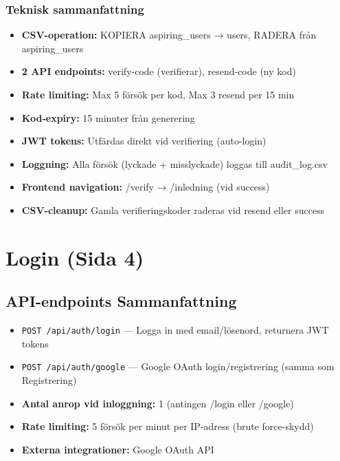 \documentclass[12pt,a4paper]{article}
\begin{document}
\subsubsection{Teknisk sammanfattning}
\begin{itemize}[noitemsep]
  \item \textbf{CSV-operation:} KOPIERA aspiring\_users → users, RADERA från aspiring\_users
  \item \textbf{2 API endpoints:} verify-code (verifierar), resend-code (ny kod)
  \item \textbf{Rate limiting:} Max 5 försök per kod, Max 3 resend per 15 min
  \item \textbf{Kod-expiry:} 15 minuter från generering
  \item \textbf{JWT tokens:} Utfärdas direkt vid verifiering (auto-login)
  \item \textbf{Loggning:} Alla försök (lyckade + misslyckade) loggas till audit\_log.csv
  \item \textbf{Frontend navigation:} /verify → /inledning (vid success)
  \item \textbf{CSV-cleanup:} Gamla verifieringskoder raderas vid resend eller success
\end{itemize}

\newpage


\section{Login (Sida 4)}

\subsection{API-endpoints Sammanfattning}
\begin{itemize}[noitemsep]
  \item \texttt{POST /api/auth/login} — Logga in med email/lösenord, returnera JWT tokens
  \item \texttt{POST /api/auth/google} — Google OAuth login/registrering (samma som Registrering)
  \item \textbf{Antal anrop vid inloggning:} 1 (antingen /login eller /google)
  \item \textbf{Rate limiting:} 5 försök per minut per IP-adress (brute force-skydd)
  \item \textbf{Externa integrationer:} Google OAuth API
\end{itemize}
\end{document}
